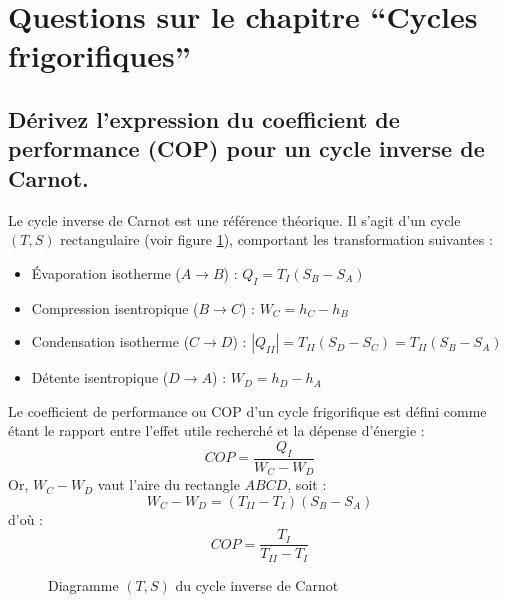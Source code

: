 \section{Questions sur le chapitre ``Cycles frigorifiques''}

\subsection{Dérivez l'expression du coefficient de performance (COP) pour un cycle inverse de Carnot.}
Le cycle inverse de Carnot est une référence théorique. Il s'agit d'un cycle $(T,S)$ rectangulaire (voir figure \ref{fig:TSCarnot}), comportant les transformation suivantes :
\begin{itemize}
\item Évaporation isotherme ($A\rightarrow B$) : $Q_I = T_I(S_B-S_A)$
\item Compression isentropique ($B\rightarrow C$) : $W_C = h_C-h_B$
\item Condensation isotherme ($C\rightarrow D$) : $|Q_{II}| = T_{II}(S_D-S_C) = T_{II}(S_B-S_A)$
\item Détente isentropique ($D\rightarrow A$) : $W_D = h_D - h_A$
\end{itemize}
Le coefficient de performance ou COP d'un cycle frigorifique est défini comme étant le rapport entre l'effet utile recherché et la dépense d'énergie :
\begin{equation} COP = \frac{Q_I}{W_C-W_D}\end{equation}
Or, $W_C-W_D$ vaut l'aire du rectangle $ABCD$, soit :
\begin{equation} W_C-W_D = (T_{II}-T_I)(S_B-S_A) \end{equation}
d'où :
\begin{equation} COP = \frac{T_I}{T_{II}-T_I} \end{equation}
\begin{figure}[p]\centering
    \caption{Diagramme $(T,S)$ du cycle inverse de Carnot}
    \label{fig:TSCarnot}
\end{figure}

